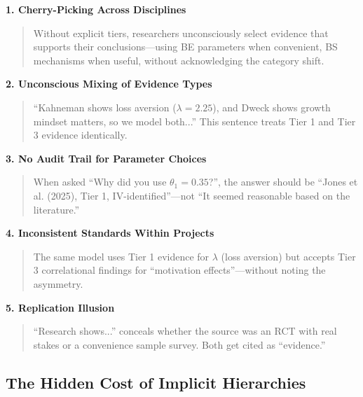 \documentclass[11pt, a4paper]{article}
\begin{document}
\begin{tcolorbox}[colback=red!5!white, colframe=red!75!black,
    title=The Five Dangers of Implicit Evidence Hierarchies]

\textbf{1. Cherry-Picking Across Disciplines}
\begin{quote}
Without explicit tiers, researchers unconsciously select evidence that supports their conclusions---using BE parameters when convenient, BS mechanisms when useful, without acknowledging the category shift.
\end{quote}

\textbf{2. Unconscious Mixing of Evidence Types}
\begin{quote}
``Kahneman shows loss aversion ($\lambda = 2.25$), and Dweck shows growth mindset matters, so we model both...'' This sentence treats Tier 1 and Tier 3 evidence identically.
\end{quote}

\textbf{3. No Audit Trail for Parameter Choices}
\begin{quote}
When asked ``Why did you use $\theta_1 = 0.35$?'', the answer should be ``Jones et al. (2025), Tier 1, IV-identified''---not ``It seemed reasonable based on the literature.''
\end{quote}

\textbf{4. Inconsistent Standards Within Projects}
\begin{quote}
The same model uses Tier 1 evidence for $\lambda$ (loss aversion) but accepts Tier 3 correlational findings for ``motivation effects''---without noting the asymmetry.
\end{quote}

\textbf{5. Replication Illusion} \citep{simmons2011false}
\begin{quote}
``Research shows...'' conceals whether the source was an RCT with real stakes or a convenience sample survey. Both get cited as ``evidence.''
\end{quote}

\end{tcolorbox}

\subsection{The Hidden Cost of Implicit Hierarchies}
\end{document}
